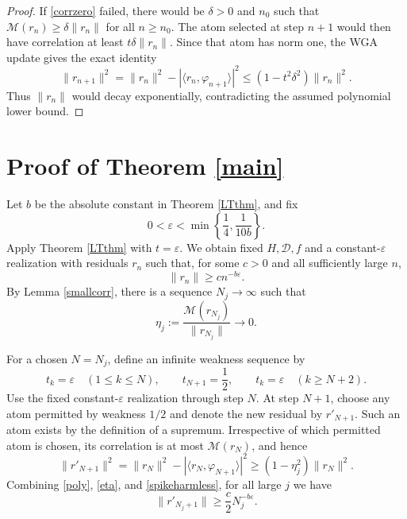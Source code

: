 \documentclass[11pt]{article}
\newcommand{\Mcal}{\mathcal M}
\begin{document}
\begin{proof}
If \eqref{corrzero} failed, there would be $\delta>0$ and $n_0$ such that
$\Mcal(r_n)\geq\delta\|r_n\|$ for all $n\geq n_0$. The atom selected at
step $n+1$ would then have correlation at least
$t\delta\|r_n\|$. Since that atom has norm one, the WGA update gives the
exact identity
\[
 \|r_{n+1}\|^2
 =\|r_n\|^2-|\langle r_n,\varphi_{n+1}\rangle|^2
 \leq(1-t^2\delta^2)\|r_n\|^2.
\]
Thus $\|r_n\|$ would decay exponentially, contradicting the assumed
polynomial lower bound.
\end{proof}

\section{Proof of Theorem \ref{main}}

Let $b$ be the absolute constant in Theorem \ref{LTthm}, and fix
\[
 0<\varepsilon<\min\left\{\frac14,\frac{1}{10b}\right\}.
\]
Apply Theorem \ref{LTthm} with $t=\varepsilon$. We obtain fixed
$H,\mathcal D,f$ and a constant-$\varepsilon$ realization with residuals
$r_n$ such that, for some $c>0$ and all sufficiently large $n$,
\begin{equation}\label{poly}
 \|r_n\|\geq c n^{-b\varepsilon}.
\end{equation}
By Lemma \ref{smallcorr}, there is a sequence $N_j\to\infty$ such that
\begin{equation}\label{eta}
 \eta_j:=\frac{\Mcal(r_{N_j})}{\|r_{N_j}\|}\longrightarrow0.
\end{equation}

For a chosen $N=N_j$, define an infinite weakness sequence by
\[
 t_k=\varepsilon\quad(1\leq k\leq N),
 \qquad t_{N+1}=\frac12,
 \qquad t_k=\varepsilon\quad(k\geq N+2).
\]
Use the fixed constant-$\varepsilon$ realization through step $N$. At step
$N+1$, choose any atom permitted by weakness $1/2$ and denote the new
residual by $r'_{N+1}$. Such an atom exists by the definition of a supremum.
Irrespective of which permitted atom is chosen, its correlation is at most
$\Mcal(r_N)$, and hence
\begin{equation}\label{spikeharmless}
 \|r'_{N+1}\|^2
 =\|r_N\|^2-|\langle r_N,\varphi_{N+1}\rangle|^2
 \geq(1-\eta_j^2)\|r_N\|^2.
\end{equation}
Combining \eqref{poly}, \eqref{eta}, and \eqref{spikeharmless}, for all
large $j$ we have
\begin{equation}\label{reslower}
 \|r'_{N_j+1}\|\geq \frac c2 N_j^{-b\varepsilon}.
\end{equation}
\end{document}
